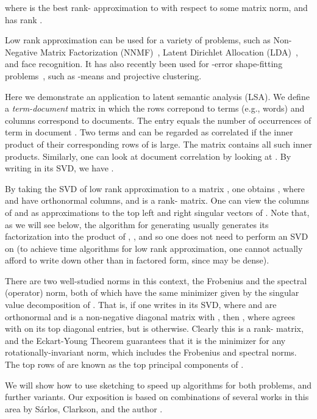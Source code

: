 \documentclass[11pt]{article}
\begin{document}
where  is the best rank- approximation to  with respect to some
matrix norm, and  has rank . 

Low rank approximation can be used for a variety of problems, such as
Non-Negative Matrix Factorization (NNMF)~\cite{seung2001algorithms}, 
Latent Dirichlet Allocation (LDA)~\cite{blei2003latent}, and face recognition. 
It has also recently been used for -error shape-fitting
problems~\cite{dan2013tiny}, such as -means and projective clustering. 

Here we demonstrate an application to latent semantic analysis (LSA). We define a {\it term-document}
matrix  in which the rows correpond to terms (e.g., words) and columns correspond to documents. The entry
 equals the number of occurrences of term  in document . Two terms  and  can be regarded 
as correlated
if the inner product  of their corresponding rows of  is large. The matrix
 contains all such inner products. Similarly, one can look at document correlation by looking at .
By writing  in its SVD, we have . 

By taking the SVD of low rank approximation  to a matrix , 
one obtains , where
 and  have orthonormal columns, 
and  is a rank- matrix. One can view the columns of  and  as approximations
to the top  left and right singular vectors of .  Note that, as we will see below, the algorithm for generating
 usually generates its factorization into the product of , , and  
so one does not need to perform
an SVD on  (to achieve  time algorithms for low rank approximation, one
cannot actually afford to write down  other than in factored form, since  may be dense). 

There are two well-studied norms in this context, the Frobenius
and the spectral (operator) norm, both of which have the same minimizer 
 given by the singular value decomposition of . That is, if one
writes  in its SVD, where  and  are orthonormal
and  is a non-negative diagonal matrix with 
, 
then , where  agrees with  on its
top  diagonal entries, but is  otherwise. Clearly this is a rank-
matrix, and the Eckart-Young Theorem guarantees that it is the minimizer
for any rotationally-invariant norm, which includes the Frobenius and
spectral norms. The top  rows of  are known as the top  principal 
components of . 

We will show how
to use sketching to speed up algorithms for both problems, and further variants.
Our exposition is based on combinations of several works in this area by S\'arlos,
Clarkson, and the author \cite{S06,CW09,CW13}. 
\end{document}
